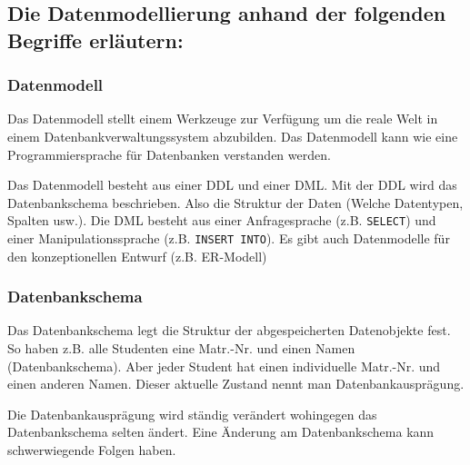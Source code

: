 \subsection{Die Datenmodellierung anhand der folgenden Begriffe erläutern:}

\subsubsection{Datenmodell}

Das Datenmodell stellt einem Werkzeuge zur Verfügung um die reale Welt in einem Datenbankverwaltungssystem abzubilden. Das Datenmodell kann wie eine Programmiersprache für Datenbanken verstanden werden. 

Das Datenmodell besteht aus einer \ac{DDL} und einer \ac{DML}. Mit der \ac{DDL} wird das Datenbankschema beschrieben. Also die Struktur der Daten (Welche Datentypen, Spalten usw.). Die \ac{DML} besteht aus einer Anfragesprache (z.B. \texttt{SELECT}) und einer Manipulationssprache (z.B. \texttt{INSERT INTO}). Es gibt auch Datenmodelle für den konzeptionellen Entwurf (z.B. ER-Modell)

\subsubsection{Datenbankschema}

Das Datenbankschema legt die Struktur der abgespeicherten Datenobjekte fest. So haben z.B. alle Studenten eine Matr.-Nr. und einen Namen (Datenbankschema). Aber jeder Student hat einen individuelle Matr.-Nr. und einen anderen Namen. Dieser aktuelle Zustand nennt man Datenbankausprägung. 

Die Datenbankausprägung wird ständig verändert wohingegen das Datenbankschema selten ändert. Eine Änderung am Datenbankschema kann schwerwiegende Folgen haben.